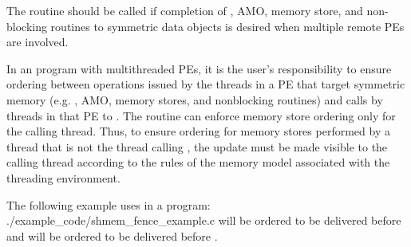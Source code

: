 \begin{apidefinition}
{    The  routine should be called if completion of \PUT{},
    \ac{AMO}, memory store, and non-blocking \PUT{} routines to symmetric data objects is desired
    when multiple remote \acp{PE} are involved.

    In an \openshmem program with multithreaded \acp{PE}, it is the
    user's responsibility to ensure ordering between operations issued by the threads
    in a \ac{PE} that target symmetric memory (e.g. \PUT{}, \ac{AMO}, memory stores,
    and nonblocking routines) and calls by threads in that \ac{PE} to
    . The  routine can enforce memory store ordering only for the
    calling thread. Thus, to ensure ordering for memory stores performed by a thread that is
    not the thread calling , the update must be made visible to the
    calling thread according to the rules of the memory model associated with
    the threading environment.
}

\begin{apiexamples}

\apicexample
    {The following example uses  in a \Cstd[11] program: }
    {./example_code/shmem_fence_example.c}
    { will be ordered to be delivered before  and 
    will be ordered to be delivered before .}

\end{apiexamples}

\end{apidefinition}
